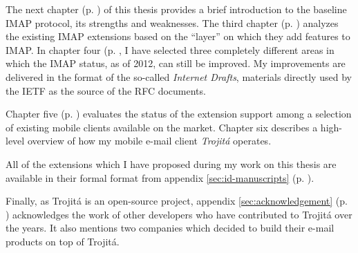 \documentclass[trojita]{subfiles}
\begin{document}
The next chapter (p. \pageref{sec:imap-protocol}) of this thesis provides a brief introduction to the baseline IMAP
protocol, its strengths and weaknesses.  The third chapter (p. \pageref{sec:imap-extensions}) analyzes the existing IMAP
extensions based on the ``layer'' on which they add features to IMAP.  In chapter four (p.
\pageref{sec:proposed-extensions}, I have selected three completely different areas in which the IMAP status, as of
2012, can still be improved.  My improvements are delivered in the format of the so-called {\em Internet Drafts},
materials directly used by the IETF as the source of the RFC documents.

Chapter five (p. \pageref{sec:mobile-imap}) evaluates the status of the extension support among a selection of existing
mobile clients available on the market.  Chapter six describes a high-level overview of how my mobile e-mail
client {\em Trojitá} operates.

All of the extensions which I have proposed during my work on this thesis are available in their formal format from
appendix \ref{sec:id-manuscripts} (p. \pageref{sec:id-manuscripts}).

Finally, as Trojitá is an open-source project, appendix \ref{sec:acknowledgement} (p. \pageref{sec:acknowledgement})
acknowledges the work of other developers who have contributed to Trojitá over the years.  It also mentions two
companies which decided to build their e-mail products on top of Trojitá.
\end{document}
